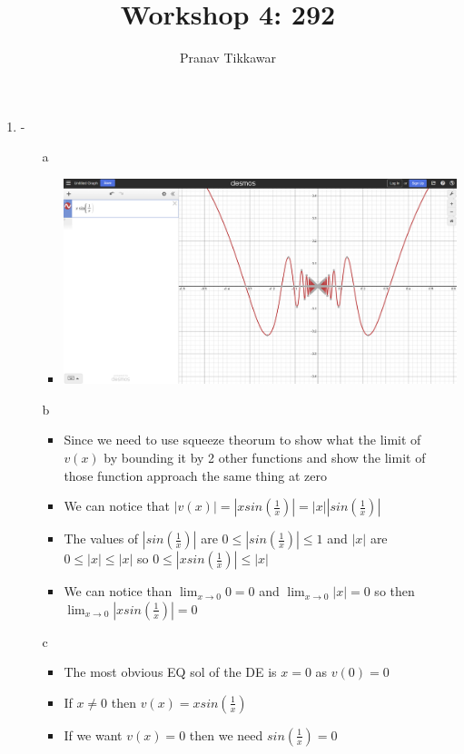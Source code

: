 \documentclass{article}
\author{Pranav Tikkawar}
\title{Workshop 4: 292}
\begin{document}
\maketitle
\begin{enumerate}
    \item - \begin{enumerate}
        \item [a] \begin{itemize}
            \item \includegraphics[scale=.2]{xsin.png}
        \end{itemize}
        \item [b] \begin{itemize}
            \item Since we need to use squeeze theorum to show what the limit of $v(x)$ by bounding it by 2 other functions and show the limit of those function approach the same thing at zero
            \item We can notice that $|v(x)| = |xsin(\frac{1}{x})| = |x| |sin(\frac{1}{x})|$
            \item The values of $|sin(\frac{1}{x})|$ are $0 \leq |sin(\frac{1}{x})| \leq 1$ and $|x|$ are $0 \leq |x| \leq |x| $ so $0 \leq |xsin(\frac{1}{x})| \leq |x|$
            \item We can notice than $\lim_{x \rightarrow 0} 0 = 0 $ and $\lim_{x \rightarrow 0} |x| = 0 $ so then $\lim_{x \rightarrow 0} |xsin(\frac{1}{x})|  = 0 $
        \end{itemize}
        \item [c] \begin{itemize}
            \item The most obvious EQ sol of the DE is $x = 0$ as $v(0)=0$
            \item If $x \neq 0 $ then $v(x) = xsin(\frac{1}{x})$
            \item If we want $v(x) = 0$ then we need $sin(\frac{1}{x}) = 0$

\end{itemize}
\end{enumerate}
\end{enumerate}
\end{document}

